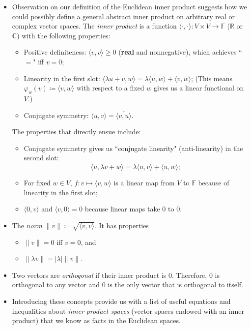 \documentclass{article}
\newcommand{\R}{\mathbb{R}}
\newcommand{\C}{\mathbb{C}}
\newcommand{\F}{\mathbb{F}}
\newcommand{\conj}[1]{\overline{#1}}
\newcommand{\inp}[2]{\langle #1, #2 \rangle}
\renewcommand{\phi}{\varphi}
\begin{document}
\begin{itemize}
    \item Observation on our definition of the Euclidean inner product suggests how we could possibly define a general abstract inner product on arbitrary real or complex vector spaces. The \textit{inner product} is a function $\inp{\cdot}{\cdot}: V \times V \to \F$ ($\R$ or $\C$) with the following properties:
    \begin{itemize}
        \item Positive definiteness: $\inp{v}{v} \geq 0$ (\textbf{real} and nonnegative), which achieves ``$=$" iff $v = 0$;
        \item Linearity in the first slot: $\inp{\lambda u+v}{w} = \lambda \inp{u}{w} + \inp{v}{w}$; (This means $\phi_w(v) \coloneqq \inp{v}{w}$ with respect to a fixed $w$ gives us a linear functional on $V$.)
        \item Conjugate symmetry: $\inp{u}{v} = \conj{\inp{v}{u}}$.
    \end{itemize}
    The properties that directly ensue include:
    \begin{itemize}
        \item Conjugate symmetry gives us ``conjugate linearity" (anti-linearity) in the second slot: $$\inp{u}{\lambda v+w} = \conj{\lambda} \inp{u}{v} + \inp{u}{w};$$
        \item For fixed $w \in V$, $f: v \mapsto \inp{v}{w}$ is a linear map from $V$ to $\F$ because of linearity in the first slot;
        \item $\inp{0}{v}$ and $\inp{v}{0} = 0$ because linear maps take 0 to 0.
    \end{itemize}
    \item The \textit{norm} $\|v\| \coloneqq \sqrt{\inp{v}{v}}.$ It has properties
    \begin{itemize}
        \item $\|v\| = 0$ iff $v = 0$, and 
        \item $\|\lambda v\| = |\lambda| \|v\|$.
    \end{itemize}
    \item Two vectors are \textit{orthogonal} if their inner product is 0. Therefore, 0 is orthogonal to any vector and 0 is the only vector that is orthogonal to itself.
    \item Introducing these concepts provide us with a list of useful equations and inequalities about \textit{inner product spaces} (vector spaces endowed with an inner product) that we know as facts in the Euclidean spaces.
    \begin{itemize}

\end{itemize}
\end{itemize}
\end{document}

